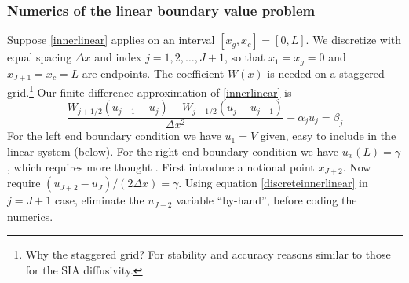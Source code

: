 \documentclass[titlepage,a4paper,final,12pt]{scrartcl}
\begin{document}
\subsubsection*{Numerics of the linear boundary value problem}  Suppose \eqref{innerlinear} applies on an interval $[x_g,x_c]=[0,L]$.  We discretize with equal spacing $\Delta x$ and index $j=1,2,\dots,J+1$, so that $x_1 = x_g = 0$ and $x_{J+1} = x_c = L$ are endpoints.  The coefficient $W(x)$ is needed on a staggered grid.\footnote{Why the staggered grid?  For stability and accuracy reasons similar to those for the SIA diffusivity.}  Our finite difference approximation of \eqref{innerlinear} is
\begin{equation}
  \frac{W_{j+1/2} (u_{j+1} - u_j) - W_{j-1/2} (u_{j} - u_{j-1})}{\Delta x^2} - \alpha_j u_j = \beta_j  \label{discreteinnerlinear}
\end{equation}
For the left end boundary condition we have $u_1 = V$ given, easy to include in the linear system (below).  For the right end boundary condition we have $u_x(L)=\gamma$, which requires more thought \cite{MortonMayers}.  First introduce a notional point $x_{J+2}$.  Now require $(u_{J+2} - u_J)/(2 \Delta x) = \gamma$.  Using equation \eqref{discreteinnerlinear} in $j=J+1$ case, eliminate the $u_{J+2}$ variable ``by-hand'', before coding the numerics.
\end{document}
